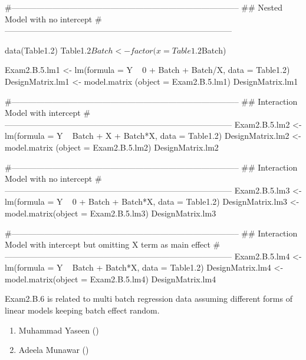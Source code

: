 \documentclass[a4paper]{book}
\begin{document}
%
\begin{SeeAlso}
\end{SeeAlso}
%
\begin{Examples}
\begin{ExampleCode}
#-----------------------------------------------------------------------------------
## Nested Model with no intercept
#-----------------------------------------------------------------------------------

data(Table1.2)
Table1.2$Batch <- factor(x = Table1.2$Batch)

Exam2.B.5.lm1 <- lm(formula = Y ~ 0 + Batch + Batch/X, data = Table1.2)
DesignMatrix.lm1 <- model.matrix (object = Exam2.B.5.lm1)
DesignMatrix.lm1

#-----------------------------------------------------------------------------------
## Interaction Model with intercept
#-----------------------------------------------------------------------------------
Exam2.B.5.lm2 <-lm(formula = Y ~ Batch + X + Batch*X, data  = Table1.2)
DesignMatrix.lm2 <-   model.matrix (object = Exam2.B.5.lm2)
DesignMatrix.lm2

#-----------------------------------------------------------------------------------
## Interaction Model with no intercept
#-----------------------------------------------------------------------------------
Exam2.B.5.lm3 <- lm(formula = Y ~ 0 + Batch + Batch*X, data = Table1.2)
DesignMatrix.lm3 <-   model.matrix(object = Exam2.B.5.lm3)
DesignMatrix.lm3

#-----------------------------------------------------------------------------------
## Interaction Model with intercept  but omitting X term as main effect
#-----------------------------------------------------------------------------------
Exam2.B.5.lm4 <- lm(formula = Y ~ Batch + Batch*X, data = Table1.2)
DesignMatrix.lm4 <-   model.matrix(object = Exam2.B.5.lm4)
DesignMatrix.lm4

\end{ExampleCode}
\end{Examples}
%
\begin{Description}
Exam2.B.6 is related to multi batch regression data assuming different forms of linear models keeping batch effect random.
\end{Description}
%
\begin{Author}
\begin{enumerate}

\item{}  Muhammad Yaseen ()
\item{} Adeela Munawar ()

\end{enumerate}

\end{Author}
\end{document}
